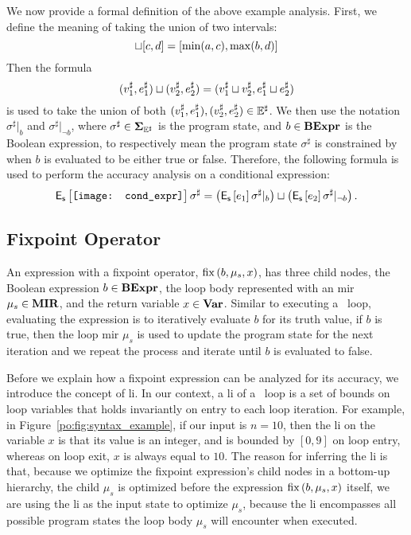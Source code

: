 We now provide a formal definition of the above example analysis.  First, we
define the meaning of taking the union of two intervals:
\begin{equation}
    [a, b] \join [c, d] = [\min(a, c), \max(b, d)]
\end{equation}
Then the formula
\begin{equation}
    (v^\sharp_1, e^\sharp_1) \sqcup (v^\sharp_2, e^\sharp_2) =
    (v^\sharp_1 \sqcup v^\sharp_2, e^\sharp_1 \sqcup e^\sharp_2) 
\end{equation}
is used to take the union of both $(v^\sharp_1, e^\sharp_1), (v^\sharp_2,
e^\sharp_2) \in \mathbb{E}^\sharp$.  We then use the notation $\sigma^\sharp|_b$ and
$\sigma^\sharp|_{\neg b}$, where $\sigma^\sharp \in \mathbf{\Sigma}_{\mathbb{E}^\sharp}$ is the program
state, and $b \in \mathbf{BExpr}$ is the Boolean expression, to respectively mean
the program state $\sigma^\sharp$ is constrained by when $b$ is evaluated to be
either true or false.  Therefore, the following formula is used to perform the
accuracy analysis on a conditional expression:
\begin{equation}
    \exprerrorfunc{%
        \begin{aligned}
            \texttt{[image: cond\_expr]}
            \vspace{-5pt}
        \end{aligned}
    }{\sigma^\sharp}
    =
    \left(\exprerrorfunc{e_1}{\sigma^\sharp|_b}\right) \join
    \left(\exprerrorfunc{e_2}{\sigma^\sharp|_{\neg b}}\right).
\end{equation}

\subsection{Fixpoint Operator}

An expression with a fixpoint operator, $\operatorname{\mathrm{fix}}\left({b, \mu_s, x}\right)$, has
three child nodes, the Boolean expression $b \in \mathbf{BExpr}$, the loop body
represented with an \gls{mir} $\mu_s \in \mathbf{MIR}$, and the return variable $x
\in \mathbf{Var}$.  Similar to executing a \whilelit~loop, evaluating the expression
is to iteratively evaluate $b$ for its truth value, if $b$ is true, then
the loop \gls{mir} $\mu_s$ is used to update the program state for the next
iteration and we repeat the process and iterate until $b$ is evaluated to
false.

Before we explain how a fixpoint expression can be analyzed for its
accuracy, we introduce the concept of \gls{li}.  In our context, a
\gls{li} of a \whilelit~loop is a set of bounds on loop variables that
holds invariantly on entry to each loop iteration.  For example, in
Figure~\ref{po:fig:syntax_example}, if our input is $n = 10$, then the \gls{li}
on the variable $x$ is that its value is an integer, and is bounded by $[0,
9]$ on loop entry, whereas on loop exit, $x$ is always equal to $10$.  The
reason for inferring the \gls{li} is that, because we optimize the fixpoint
expression's child nodes in a bottom-up hierarchy, the child $\mu_s$ is
optimized before the expression $\operatorname{\mathrm{fix}}\left({b, \mu_s, x}\right)$ itself, we are using
the \gls{li} as the input state to optimize $\mu_s$, because the \gls{li}
encompasses all possible program states the loop body $\mu_s$ will encounter
when executed.

